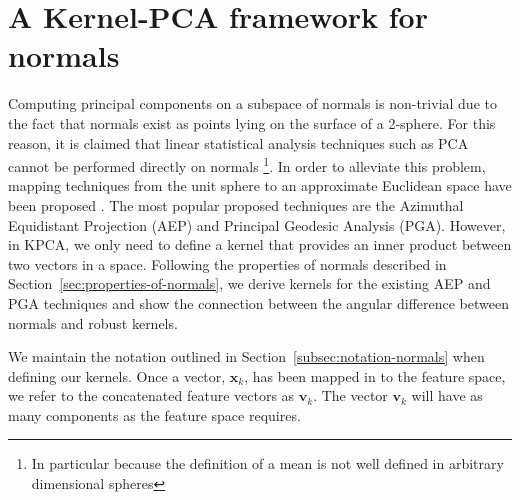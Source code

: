 \section{A Kernel-PCA framework for normals}\label{sec:kernel-pca-for-normals}
Computing principal components on a subspace of normals is non-trivial due to the fact that normals exist as points lying on the surface of a 2-sphere. For this reason, it is claimed that linear statistical analysis techniques such as PCA cannot be performed directly on normals \footnote{In particular because the definition of a mean is not well defined in arbitrary dimensional spheres}. In order to alleviate this problem, mapping techniques from the unit sphere to an approximate Euclidean space have been proposed \cite{RefWorks:86,RefWorks:90,RefWorks:100}. The most popular proposed techniques are the Azimuthal Equidistant Projection (AEP) and Principal Geodesic Analysis (PGA).  However, in KPCA, we only need to define a kernel that provides an inner product between two vectors in a space. Following the properties of normals described in Section~\ref{sec:properties-of-normals}, we derive kernels for the existing AEP and PGA techniques and show the connection between the angular difference between normals and robust kernels.

We maintain the notation outlined in Section~\ref{subsec:notation-normals} when defining our kernels. Once a vector, $\boldsymbol{x}_k$, has been mapped in to the feature space, we refer to the concatenated feature vectors as $\boldsymbol{v}_k$. The vector $\boldsymbol{v}_k$ will have as many components as the feature space requires.


